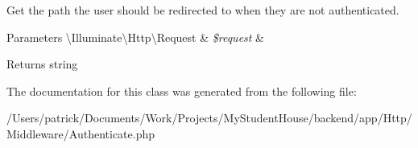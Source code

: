 Get the path the user should be redirected to when they are not authenticated.


\begin{DoxyParams}[1]{Parameters}
\textbackslash{}\+Illuminate\textbackslash{}\+Http\textbackslash{}\+Request & {\em \$request} & \\
\hline
\end{DoxyParams}
\begin{DoxyReturn}{Returns}
string 
\end{DoxyReturn}


The documentation for this class was generated from the following file\+:\begin{DoxyCompactItemize}
\item 
/\+Users/patrick/\+Documents/\+Work/\+Projects/\+My\+Student\+House/backend/app/\+Http/\+Middleware/Authenticate.\+php\end{DoxyCompactItemize}
